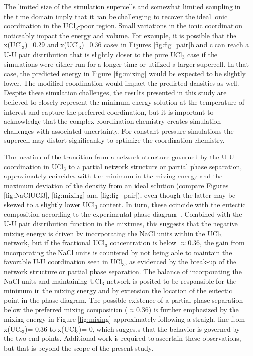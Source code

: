 \documentclass[preprint,3p,10pt,onecolumn,number,sort&compress]{elsarticle}
\begin{document}
{The limited size of the simulation supercells and somewhat limited sampling in the time domain imply that it can be challenging to recover the ideal ionic coordination in the UCl$_3$-poor region. Small variations in the ionic coordination noticeably impact the energy and volume. For example, it is possible that the x(UCl$_3$)=0.29 and x(UCl$_3$)=0.36 cases in Figures \ref{fig:fig_pair}b and c can reach a U-U pair distribution that is slightly closer to the pure UCl$_3$ case if the simulations were either run for a longer time or utilized a larger supercell. In that case, the predicted energy in Figure \ref{fig:mixing} would be expected to be slightly lower. The modified coordination would impact the predicted densities as well. Despite these simulation challenges, the results presented in this study are believed to closely represent the minimum energy solution at the temperature of interest and capture the preferred coordination, but it is important to acknowledge that the complex coordination chemistry creates simulation challenges with associated uncertainty. For constant pressure simulations the supercell may distort significantly to optimize the coordination chemistry.

The location of the transition from a network structure governed by the U-U coordination in UCl$_3$ to a partial network structure or partial phase separation, approximately coincides with the minimum in the mixing energy and the maximum deviation of the density from an ideal solution (compare Figures \ref{fig:NaClUCl3}, \ref{fig:mixing} and \ref{fig:fig_pair}), even though the latter may be skewed to a slightly lower UCl$_3$ content. In turn, these coincide with the eutectic composition according to the experimental phase diagram~\cite{YIN2020}. Combined with the U-U pair distribution function in the mixtures, this suggests that the negative mixing energy is driven by incorporating the NaCl units within the UCl$_3$ network,
but if the fractional UCl$_3$ concentration is below $\approx0.36$, the gain from incorporating the NaCl units is countered by not being able to maintain the favorable U-U coordination seen in UCl$_3$, as evidenced by the break-up of the network structure or partial phase separation. The balance of incorporating the  NaCl units and maintaining UCl$_3$ network is posited to be responsible for the minimum in the mixing energy and by extension the location of the eutectic point in the phase diagram. The possible existence of a partial phase separation below the preferred mixing composition ($\approx 0.36$) is further emphasized by the mixing energy in Figure \ref{fig:mixing} approximately following a straight line from x(UCl$_3$)= 0.36 to x(UCl$_3$)= 0, which suggests that the behavior is governed by the two end-points. Additional work is required to ascertain these observations, but that is beyond the scope of the present study.

}
\end{document}
